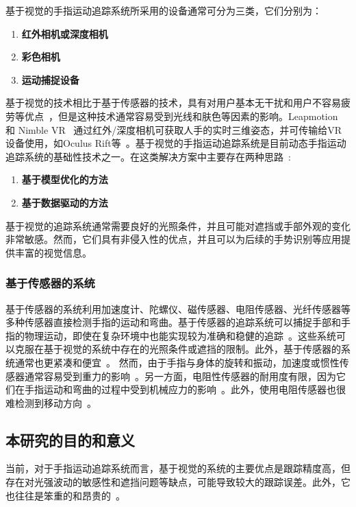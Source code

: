 基于视觉的手指运动追踪系统所采用的设备通常可分为三类，它们分别为：
\begin{enumerate}[label=(\alph*)]
    \item {\bfseries 红外相机或深度相机}
    \item {\bfseries 彩色相机}
    \item {\bfseries 运动捕捉设备}
\end{enumerate}

基于视觉的技术相比于基于传感器的技术，具有对用户基本无干扰和用户不容易疲劳等优点~\cite{introArticle8}，但是这种技术通常容易受到光线和肤色等因素的影响。Leapmotion~\cite{introArticle7} 和 Nimble VR~\cite{introArticle9} 通过红外/深度相机可获取人手的实时三维姿态，并可传输给VR设备使用，如Oculus Rift等~\cite{introArticle10}。基于视觉的手指运动追踪系统是目前动态手指运动追踪系统的基础性技术之一。在这类解决方案中主要存在两种思路~\cite{introArticle11}: 
\begin{enumerate}[label=(\alph*)]
    \item {\bfseries 基于模型优化的方法}
    \item {\bfseries 基于数据驱动的方法}
\end{enumerate}

基于视觉的追踪系统通常需要良好的光照条件，并且可能对遮挡或手部外观的变化非常敏感。然而，它们具有非侵入性的优点，并且可以为后续的手势识别等应用提供丰富的视觉信息。
\subsubsection{基于传感器的系统}

基于传感器的系统利用加速度计、陀螺仪、磁传感器、电阻传感器、光纤传感器等多种传感器直接检测手指的运动和弯曲。基于传感器的追踪系统可以捕捉手部和手指的物理运动，即使在复杂环境中也能实现较为准确和稳健的追踪~\cite{introArticle3}。这些系统可以克服在基于视觉的系统中存在的光照条件或遮挡的限制。此外，基于传感器的系统通常也更紧凑和便宜~\cite{introArticle15}。
然而，由于手指与身体的旋转和振动，加速度或惯性传感器通常容易受到重力的影响~\cite{introArticle13}。另一方面，电阻性传感器的耐用度有限，因为它们在手指运动和弯曲的过程中受到机械应力的影响~\cite{introArticle14}。此外，使用电阻传感器也很难检测到移动方向~\cite{introArticle6}。

\subsection{本研究的目的和意义}
当前，对于手指运动追踪系统而言，基于视觉的系统的主要优点是跟踪精度高，但存在对光强波动的敏感性和遮挡问题等缺点，可能导致较大的跟踪误差。此外，它也往往是笨重的和昂贵的~\cite{introArticle5}。

